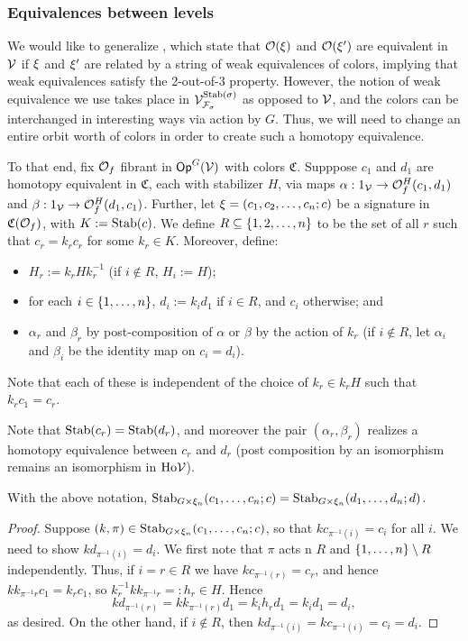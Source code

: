 \documentclass[psamsfonts,onesided,10pt,letterpaper]{amsart}%
\renewcommand{\C}{\ensuremath{\mathfrak{C}}}
\renewcommand{\F}{\mathcal F}
\renewcommand{\1}{\ensuremath{\mathbb{id}}}
\newcommand{\Vsigma}{\ensuremath{\V^{\Stab(\sigma)}_{\F_\sigma}}}
\begin{document}
\subsubsection{Equivalences between levels}

We would like to generalize \cite[4.14 and 4.15]{Cav14}, which state that
$\mathcal{O}(\xi)$ and $\mathcal{O}(\xi')$ are equivalent in $\mathcal V$ if $\xi$ and $\xi'$ are related by a string of weak equivalences of colors,
implying that weak equivalences satisfy the 2-out-of-3 property.
However, the notion of weak equivalence we use takes place in $\Vsigma$ as opposed to $\mathcal V$,
and the colors can be interchanged in interesting ways via action by $G$.
Thus, we will need to change an entire orbit worth of colors in order to create such a homotopy equivalence. 

To that end, fix $\mathcal{O}_f$ fibrant in $\mathsf{Op}^G(\mathcal V)$ with colors $\C$.
Supppose $c_1$ and $d_1$ are homotopy equivalent in $\C$, each with stabilizer $H$,
via maps $\alpha: 1_{\mathcal V} \to \mathcal{O}_f^H(c_1,d_1)$ and $\beta: 1_{\mathcal V} \to \mathcal{O}_f^H(d_1,c_1)$.
Further, let $\xi = (c_1,c_2,\ldots, c_n;c)$ be a signature in $\C(\O_f)$, with $K := \mathrm{Stab}(c)$.
We define $R\subseteq \left\{1,2,\ldots, n\right\}$ to be the set of all $r$ such that $c_r = k_r c_r$ for some $k_r\in K$. Moreover, define:
\begin{itemize}
\item $H_r := k_rHk_r^{-1}$ (if $i\not\in R$, $H_i := H$);
\item for each $i\in \left\{1,\ldots, n\right\}$, $d_i := k_id_1$ if $i\in R$, and $c_i$ otherwise; and
\item $\alpha_r$ and $\beta_r$ by post-composition of $\alpha$ or $\beta$ by the action of $k_r$ (if $i\not\in R$, let $\alpha_i$ and $\beta_i$ be the identity map on $c_i = d_i$).  
\end{itemize}
Note that each of these is independent of the choice of $k_r\in k_r H$ such that $k_r c_1 = c_r$. 

Note that $\mathrm{Stab}(c_r) = \mathrm{Stab}(d_r)$, and moreover the pair $(\alpha_r,\beta_r)$ realizes a homotopy equivalence between $c_r$ and $d_r$ (post composition by an isomorphism remains an isomorphism in $\mathrm{Ho}\mathcal V$). 

\begin{lemma}
  With the above notation, $\mathrm{Stab}_{G\times \xi_n}(c_1,\ldots, c_n;c) = \mathrm{Stab}_{G\times\xi_n}(d_1,\ldots, d_n;d)$. 
\end{lemma}
\begin{proof}
  Suppose $(k,\pi)\in \mathrm{Stab}_{G\times \xi_n}(c_1,\ldots, c_n;c)$, so that $kc_{\pi^{-1}(i)}= c_i$ for all $i$. We need to show $kd_{\pi^{-1}(i)} = d_i$. We first note that $\pi$ acts n $R$ and $\left\{1,\ldots, n\right\}\setminus R$ independently. Thus, if $i=r\in R$ we have $k c_{\pi^{-1}(r)} = c_r$, and hence $k k_{\pi^{-1}r}c_1 = k_r c_1$, so $k_r^{-1} k k_{\pi^{-1}r} =:h_r \in H$. Hence 
\[
k d_{\pi^{-1}(r)} = k k_{\pi^{-1}(r)} d_1 = k_i h_r d_1 = k_i d_1 = d_i,
\]
as desired. On the other hand, if $i\not\in R$, then $k d_{\pi^{-1}(i)} = k c_{\pi^{-1}(i)} = c_i = d_i$. 
\end{proof}
\end{document}

